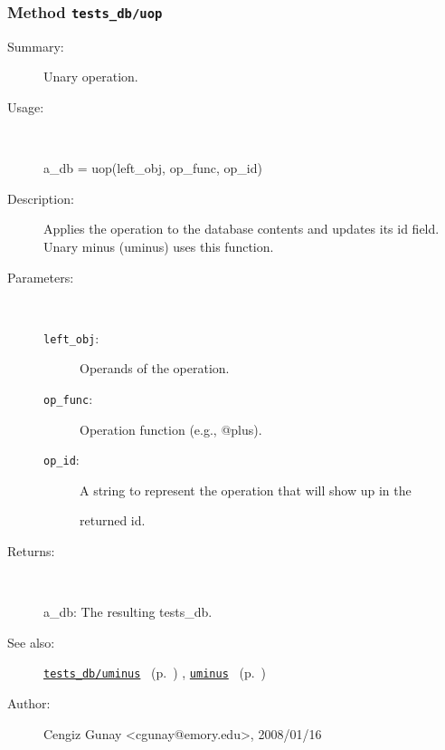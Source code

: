 \subsubsection[Method \texttt{uop}]{Method \texttt{tests\_db/uop}}%
%
\label{ref_tests_db__uop}%
\hypertarget{ref_tests_db__uop}{}%
\begin{description}
\item[Summary:]Unary operation.
%
\item[Usage:]~%
\begin{lyxcode}%
a\_db = uop(left\_obj, op\_func, op\_id)
%
\end{lyxcode}%
%
\item[Description:]%
Applies the operation to the database contents and updates its id
 field. Unary minus (uminus) uses this function.
\item[Parameters:]~
\begin{description}%
\item[\texttt{left\_obj}:]
 Operands of the operation.
\item[\texttt{op\_func}:]
 Operation function (e.g., @plus).
\item[\texttt{op\_id}:]
 A string to represent the operation that will show up in the

returned id.
\end{description}%
%
\item[Returns:
]~

   a\_db: The resulting tests\_db.
%
%
\item[See also:]%
\hyperlink{ref_tests_db__uminus}{\texttt{tests\_db/uminus}}%
\ (p.~\pageref{ref_tests_db__uminus})%
%
, \hyperlink{ref_uminus}{\texttt{uminus}}%
\ (p.~\pageref{ref_uminus})%
%
%
\item[Author:]%
Cengiz Gunay <cgunay@emory.edu>, 2008/01/16
%
\end{description}
\methodline%
